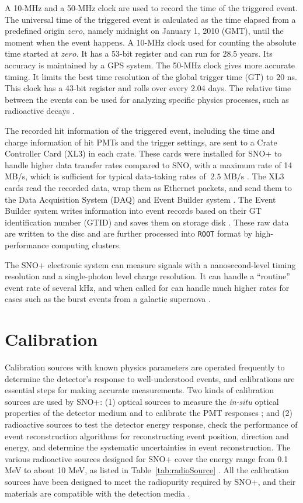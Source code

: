 A 10-MHz and a 50-MHz clock are used to record the time of the triggered event. The universal time of the triggered event is calculated as the time elapsed from a predefined origin $zero$, namely midnight on January 1, 2010 (GMT), until the moment when the event happens. A 10-MHz clock used for counting the absolute time started at $zero$. It has a 53-bit register and can run for 28.5 years. Its accuracy is maintained by a GPS system. The 50-MHz clock gives more accurate timing. It limits the best time resolution of the global trigger time (GT) to 20 ns. This clock has a 43-bit register and rolls over every 2.04 days. The relative time between the events can be used for analyzing specific physics processes, such as radioactive decays \cite{stringer2019sensitivity,rattime}. 

The recorded hit information of the triggered event, including the time and charge information of hit PMTs and the trigger settings, are sent to a Crate Controller Card (XL3) in each crate. These cards were installed for SNO+ to handle higher data transfer rates compared to SNO, with a maximum rate of 14 MB/s, which is sufficient for typical data-taking rates of $~2.5$ MB/s \cite{bonventre2014neutron,rumleskie2021sno+}. The XL3 cards read the recorded data, wrap them as Ethernet packets, and send them to the Data Acquisition System (DAQ) and Event Builder system \cite{walker2016study}. The Event Builder system writes information into event records based on their GT identification number (GTID) and saves them on storage disk \cite{snop_jinst}. These raw data are written to the disc and are further processed into \texttt{ROOT} format by high-performance computing clusters.

The SNO+ electronic system can measure signals with a nanosecond-level timing resolution and a single-photon level charge resolution. It can handle a ``routine'' event rate of several kHz, and when called for can handle much higher rates for cases such as the burst events from a galactic supernova \cite{snop_jinst}.

\section{Calibration}\label{sect:calibr}

Calibration sources with known physics parameters are operated frequently to determine the detector's response to well-understood events, and calibrations are essential steps for making accurate measurements. Two kinds of calibration sources are used by SNO+: (1) optical sources to measure the \emph{in-situ} optical properties of the detector medium and to calibrate the PMT responses \cite{snop_jinst,anderson2021optical}; and (2) radioactive sources to test the detector energy response, check the performance of event reconstruction algorithms for reconstructing event position, direction and energy, and determine the systematic uncertainties in event reconstruction. The various radioactive sources designed for SNO+ cover the energy range from 0.1 MeV to about 10 MeV, as listed in Table~\ref{tab:radioSource} \cite{snop_jinst}. All the calibration sources have been designed to meet the radiopurity required by SNO+, and their materials are compatible with the detection media \cite{snop_jinst}.

